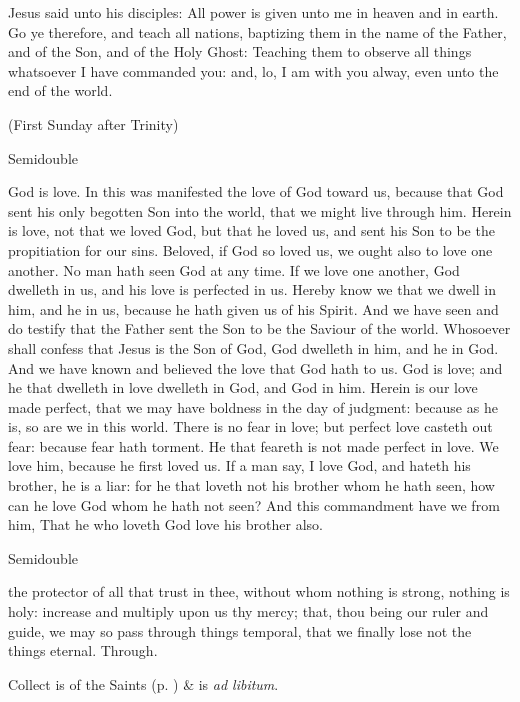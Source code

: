  Jesus said unto his disciples: All power is given unto me in heaven and in earth. Go ye therefore, and teach all nations, baptizing them in the name of the Father, and of the Son, and of the Holy Ghost: Teaching them to observe all things whatsoever I have commanded you: and, lo, I am with you alway, even unto the end of the world.


\centerline{\small{(First Sunday after Trinity)}}
\begin{inhead}
    {Semidouble}
\end{inhead}

 God is love. In this was manifested the love of God toward us, because that God sent his only begotten Son into the world, that we might live through him. Herein is love, not that we loved God, but that he loved us, and sent his Son to be the propitiation for our sins. Beloved, if God so loved us, we ought also to love one another. No man hath seen God at any time. If we love one another, God dwelleth in us, and his love is perfected in us. Hereby know we that we dwell in him, and he in us, because he hath given us of his Spirit. And we have seen and do testify that the Father sent the Son to be the Saviour of the world. Whosoever shall confess that Jesus is the Son of God, God dwelleth in him, and he in God. And we have known and believed the love that God hath to us. God is love; and he that dwelleth in love dwelleth in God, and God in him. Herein is our love made perfect, that we may have boldness in the day of judgment: because as he is, so are we in this world. There is no fear in love; but perfect love casteth out fear: because fear hath torment. He that feareth is not made perfect in love. We love him, because he first loved us. If a man say, I love God, and hateth his brother, he is a liar: for he that loveth not his brother whom he hath seen, how can he love God whom he hath not seen? And this commandment have we from him, That he who loveth God love his brother also.


\label{PentecostIII}
\begin{inhead}
    {Semidouble}
\end{inhead}

\collect
{} the protector of all that trust in thee, without whom nothing is strong, nothing is holy: increase and multiply upon us thy mercy; that, thou being our ruler and guide, we may so pass through things temporal, that we finally lose not the things eternal. Through.
\begin{rubric}
     Collect is of the Saints (p. \pageref{SPSaints}) \&  is \emph{ad libitum}.
\end{rubric}

